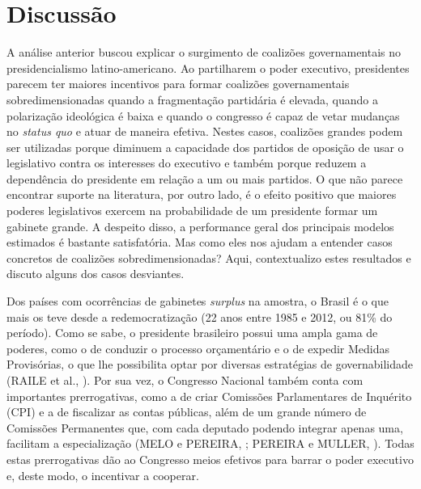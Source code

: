 \section{Discussão}
\label{sec:discussao}

A análise anterior buscou explicar o surgimento de coalizões governamentais no presidencialismo latino-americano. Ao partilharem o poder executivo, presidentes parecem ter maiores incentivos para formar coalizões governamentais sobredimensionadas quando a fragmentação partidária é elevada, quando a polarização ideológica é baixa e quando o congresso é capaz de vetar mudanças no \textit{status quo} e atuar de maneira efetiva. Nestes casos, coalizões grandes podem ser utilizadas porque diminuem a capacidade dos partidos de oposição de usar o legislativo contra os interesses do executivo e também porque reduzem a dependência do presidente em relação a um ou mais partidos. O que não parece encontrar suporte na literatura, por outro lado, é o efeito positivo que maiores poderes legislativos exercem na probabilidade de um presidente formar um gabinete grande. A despeito disso, a performance geral dos principais modelos estimados é bastante satisfatória. Mas como eles nos ajudam a entender casos concretos de coalizões sobredimensionadas? Aqui, contextualizo estes resultados e discuto alguns dos casos desviantes.

Dos países com ocorrências de gabinetes \textit{surplus} na amostra, o Brasil é o que mais os teve desde a redemocratização (22 anos entre 1985 e 2012, ou 81\% do período). Como se sabe, o presidente brasileiro possui uma ampla gama de poderes, como o de conduzir o processo orçamentário e o de expedir Medidas Provisórias, o que lhe possibilita optar por diversas estratégias de governabilidade (RAILE et al., \citeyear{raile2010}). Por sua vez, o Congresso Nacional também conta com importantes prerrogativas, como a de criar Comissões Parlamentares de Inquérito (CPI) e a de fiscalizar as contas públicas, além de um grande número de Comissões Permanentes que, com cada deputado podendo integrar apenas uma, facilitam a especialização (MELO e PEREIRA, \citeyear{melo2013}; PEREIRA e MULLER, \citeyear{pereira2000}). Todas estas prerrogativas dão ao Congresso meios efetivos para barrar o poder executivo e, deste modo, o incentivar a cooperar. 

